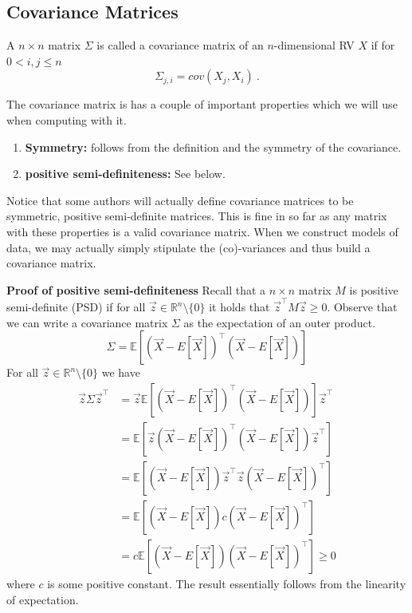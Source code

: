 \documentclass[a4paper,11pt,leqno]{report}\usepackage[]{graphicx}\usepackage[]{color}
\newcommand{\E}{\mathbb{E}}
\begin{document}
\subsection{Covariance Matrices}

\begin{Definition}
A $ n \times n $ matrix $ \Sigma $ is called a covariance matrix of an $ n $-dimensional RV $ X $ if for $ 0 < i,j \leq n $ 
$$ \Sigma_{j,i} = cov(X_{j}, X_{i}) \ . $$
\end{Definition}

The covariance matrix is has a couple of important properties which we will use when computing with it.
\begin{enumerate}
\item \textbf{Symmetry:} follows from the definition and the symmetry of the covariance.
\item \textbf{positive semi-definiteness:} See below.
\end{enumerate}
Notice that some authors will actually define covariance matrices to be symmetric, positive semi-definite matrices. This is fine in so far as any matrix with
these properties is a valid covariance matrix. When we construct models of data, we may actually simply stipulate the (co)-variances and thus build a covariance matrix.

\textbf{Proof of positive semi-definiteness} Recall that a $ n \times n $ matrix $ M $ is positive semi-definite (PSD) 
if for all $ \vec{z} \in \mathbb{R}^{n}\setminus \{0\} $ it holds
that $ \vec{z}^{\top}M\vec{z} \geq 0 $. Observe that we can write a covariance matrix $ \Sigma $ as the expectation of an outer product. 
\begin{equation}
\Sigma = \E\left[(\vec{X} - E[\vec{X}])^{\top}(\vec{X} - E[\vec{X}])\right]
\end{equation}
For all $ \vec{z} \in 
\mathbb{R}^{n}\setminus \{0\} $ we have
\begin{align}
\vec{z}\Sigma \vec{z}^{\top} 
&= \vec{z} \E\left[(\vec{X} - E[\vec{X}])^{\top}(\vec{X} - E[\vec{X}])\right] \vec{z}^{\top} \\
&=  \E\left[ \vec{z} (\vec{X} - E[\vec{X}])^{\top}(\vec{X} - E[\vec{X}]) \vec{z}^{\top} \right] \\
&= \E\left[(\vec{X} - E[\vec{X}])\vec{z}^{\top}\vec{z} (\vec{X} - E[\vec{X}])^{\top} \right] \\
&= \E\left[(\vec{X} - E[\vec{X}])c (\vec{X} - E[\vec{X}])^{\top} \right] \\
&= c \E\left[(\vec{X} - E[\vec{X}]) (\vec{X} - E[\vec{X}])^{\top} \right] \geq 0
\end{align}
where $ c $ is some positive constant. The result essentially follows from the linearity of expectation. 
\end{document}
